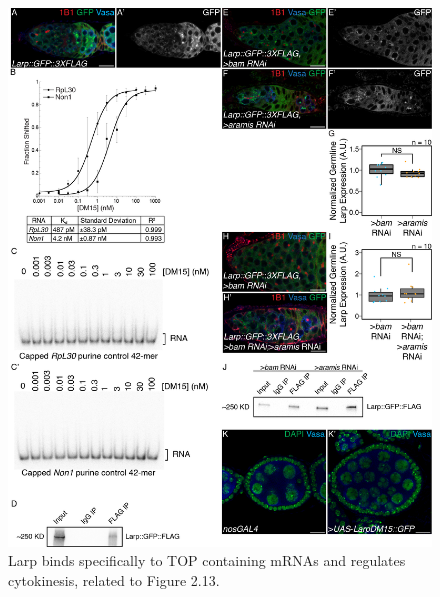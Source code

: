 \documentclass[12pt,oneside]{reedthesis}
\begin{document}
\begin{figure}

{\centering \includegraphics[width=6.5 in,height=8.9375 in]{./figure/Ribosome Biogenesis/Ribosome Biogenesis 7S} 

}

\caption[Larp binds specifically to TOP containing mRNAs and regulates cytokinesis, related to Figure 2.13.]{Larp binds specifically to TOP containing mRNAs and regulates cytokinesis, related to Figure 2.13.}\label{fig:unnamed-chunk-19}
\end{figure}
\textbf{\hfill\break
}
\end{document}
